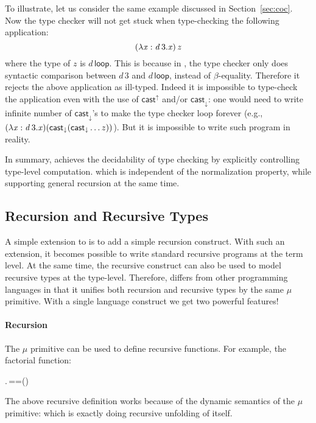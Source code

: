 To illustrate, let us consider the same example discussed in
Section~\ref{sec:coc}. Now the type checker will not get stuck when
type-checking the following application:
\[ (  \lambda  \mathit{x}  :  \mathit{d} \, 3  .  \mathit{x}  ) \, \mathit{z} \]
where the type of $z$ is $d\,\mathsf{loop}$.  This is because in
\name, the type checker only does syntactic comparison between $d\,3$
and $d\,\mathsf{loop}$, instead of $\beta$-equality. Therefore it
rejects the above application as ill-typed. Indeed it is impossible to
type-check the application even with the use of $ \mathsf{cast}^{\uparrow} $ and/or
$ \mathsf{cast}_{\downarrow} $: one would need to write infinite number of
$ \mathsf{cast}_{\downarrow} $'s to make the type checker loop forever (e.g.,
$(\lambda  \mathit{x}  :  \mathit{d} \, 3  .  \mathit{x})( \mathsf{cast}_{\downarrow} ( \mathsf{cast}_{\downarrow}  \dots z))$). But it is
impossible to write such program in reality.

In summary, \name achieves the decidability of type checking by
explicitly controlling type-level computation.  which is independent
of the normalization property, while supporting general recursion at
the same time.

\subsection{Recursion and Recursive Types}


A simple extension to \name is to add a simple recursion construct.
With such an extension, it becomes possible to write standard
recursive programs at the term level. At the same time, the recursive
construct can also be used to model recursive types at the type-level.
Therefore, \name differs from other programming languages in that it
unifies both recursion and recursive types by the same $\mu$
primitive. With a single language construct we get two powerful
features!

\paragraph{Recursion}

The $\mu$ primitive can be used to define recursive functions.  For
example, the factorial function:
\begin{hscode}\SaveRestoreHook
{}%
%
%
\>[3]{}\mu\;\mathbin{:}\to {}.\,\;==\;\;\;\;\;\times\;\;(\mathbin{-}){}\<[E]%
\ColumnHook
\end{hscode}\resethooks
The above recursive definition works because of the dynamic semantics of the
$\mu$ primitive: \ottusedrule{\ottdruleSXXMu{}} which is exactly doing
recursive unfolding of itself.

